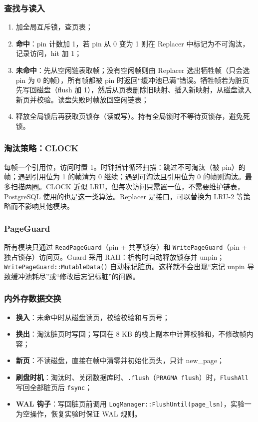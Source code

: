 \documentclass[11pt,a4paper]{ctexart}
\newcommand{\code}[1]{\texttt{#1}}
\begin{document}
\subsubsection{查找与读入}

\begin{enumerate}
  \item 加全局互斥锁，查页表；
  \item \textbf{命中}：pin 计数加 1，若 pin 从 0 变为 1 则在 Replacer 中标记为不可淘汰，记录访问，hit 加 1；
  \item \textbf{未命中}：先从空闲链表取帧；没有空闲帧则由 Replacer 选出牺牲帧（只会选 pin 为 0 的帧），所有帧都被 pin 时返回“缓冲池已满”错误。牺牲帧若为脏页先写回磁盘（flush 加 1），然后从页表删除旧映射、插入新映射，从磁盘读入新页并校验。读盘失败时帧放回空闲链表；
  \item 释放全局锁后再获取页锁存（读或写）。持有全局锁时不等待页锁存，避免死锁。
\end{enumerate}

\subsubsection{淘汰策略：CLOCK}

每帧一个引用位，访问时置 1。时钟指针循环扫描：跳过不可淘汰（被 pin）的帧；遇到引用位为 1 的帧清为 0 继续；遇到可淘汰且引用位为 0 的帧则淘汰。最多扫描两圈。CLOCK 近似 LRU，但每次访问只需置一位，不需要维护链表，PostgreSQL 使用的也是这一类算法。Replacer 是接口，可以替换为 LRU-2 等策略而不影响其他模块。

\subsubsection{PageGuard}

所有模块只通过 \code{ReadPageGuard}（pin + 共享锁存）和 \code{WritePageGuard}（pin + 独占锁存）访问页。Guard 采用 RAII：析构时自动释放锁存并 unpin；\code{WritePageGuard::MutableData()} 自动标记脏页。这样就不会出现“忘记 unpin 导致缓冲池耗尽”或“修改后忘记标脏”的问题。

\subsubsection{内外存数据交换}

\begin{itemize}
  \item \textbf{换入}：未命中时从磁盘读页，校验校验和与页号；
  \item \textbf{换出}：淘汰脏页时写回；写回在 8 KB 的栈上副本中计算校验和，不修改帧内容；
  \item \textbf{新页}：不读磁盘，直接在帧中清零并初始化页头，只计 new\_page；
  \item \textbf{刷盘时机}：淘汰时、关闭数据库时、\code{.flush}（\code{PRAGMA flush}）时，\code{FlushAll} 写回全部脏页后 \code{fsync}；
  \item \textbf{WAL 钩子}：写回脏页前调用 \code{LogManager::FlushUntil(page\_lsn)}，实验一为空操作，恢复实验时保证 WAL 规则。
\end{itemize}
\end{document}
